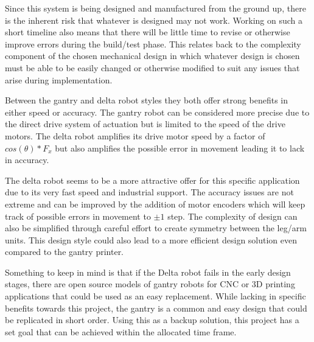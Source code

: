 \documentclass[11pt]{article}
\begin{document}
Since this system is being designed and manufactured from the ground up, there is the inherent risk that whatever is designed may not work. Working on such a short timeline also means that there will be little time to revise or otherwise improve errors during the build/test phase. This relates back to the complexity component of the chosen mechanical design in which whatever design is chosen must be able to be easily changed or otherwise modified to suit any issues that arise during implementation. 

Between the gantry and delta robot styles they both offer strong benefits in either speed or accuracy. The gantry robot can be considered more precise due to the direct drive system of actuation but is limited to the speed of the drive motors. The delta robot amplifies its drive motor speed by a factor of $cos(\theta)*F_x$ but also amplifies the possible error in movement leading it to lack in accuracy. 

The delta robot seems to be a more attractive offer for this specific application due to its very fast speed and industrial support. The accuracy issues are not extreme and can be improved by the addition of motor encoders which will keep track of possible errors in movement to $\pm 1$ step. The complexity of design can also be simplified through careful effort to create symmetry between the leg/arm units. This design style could also lead to a more efficient design solution even compared to the gantry printer. 

Something to keep in mind is that if the Delta robot fails in the early design stages, there are open source models of gantry robots for CNC or 3D printing applications that could be used as an easy replacement. While lacking in specific benefits towards this project, the gantry is a common and easy design that could be replicated in short order. Using this as a backup solution, this project has a set goal that can be achieved within the allocated time frame. 

\begin{versionhistory}
\end{versionhistory}



\end{document}
